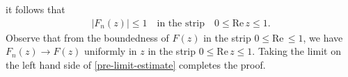 \documentclass[12pt,reqno]{amsart}
\numberwithin{equation}{section}  %
\numberwithin{figure}{section}
\theoremstyle{plain}
\theoremstyle{definition}
\theoremstyle{remark}
\begin{document}
it follows that 
%
%
%
%
\begin{equation}
\label{pre-limit-estimate}
\begin{split}
	|F_n(z)| \le 1 \quad  \text{in the strip} \quad 0 \le \text{Re}\, z \le 1.
\end{split}
\end{equation}
Observe that from the boundedness of $F(z)$ in the strip $0 \le \text{Re}\, \le
1$, we have \\ $F_n(z) \to F(z)$ uniformly in $z$
in the strip $0 \le \text{Re}\, z\le 1$. Taking the
limit on the left hand side of \eqref{pre-limit-estimate} completes the proof.
\qquad \qedsymbol




%
\end{document}
